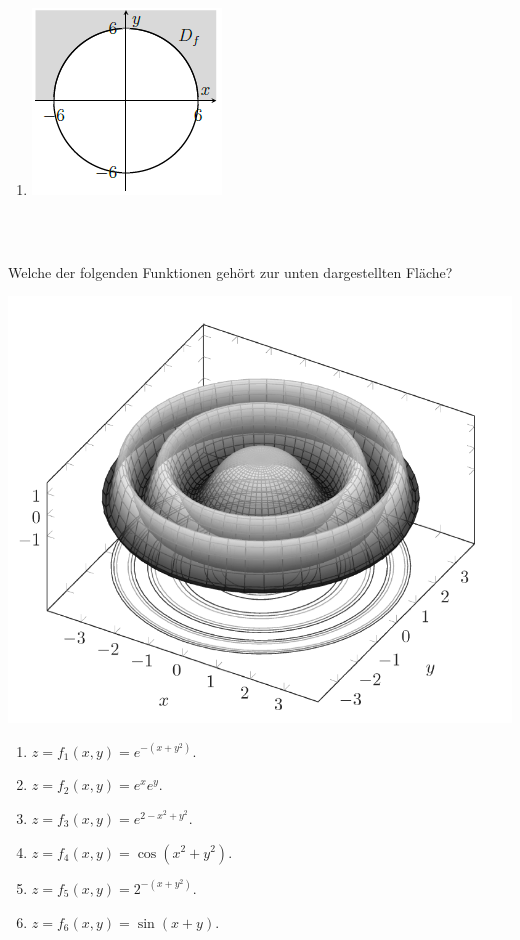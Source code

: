 \begin{enumerate}
\begin{center}
\end{center}
\item
\begin{center}
	\includegraphics[scale=0.6]{pictures/3_4_d}
\end{center}
\end{enumerate}
\ \\
\subsection*{}
Welche der folgenden Funktionen gehört zur unten dargestellten Fläche?\\
\begin{center}
	\includegraphics[scale=0.5]{pictures/3_5}
\end{center}
\renewcommand{\labelenumi}{(\alph{enumi})}
\begin{enumerate}
\item 
$ z = f_1(x,y) = e^{-(x+y^2)} $.
\item
$ z = f_2(x,y) = e^{x} e^y $.
\item
$ z = f_3(x,y) = e^{2 -x^2 +y^2}  $.
\item
$ z = f_4(x,y) = \cos(x^2 +y^2) $.
\item
$ z = f_5(x,y) = 2^{-(x + y^2)} $.
\item
$ z = f_6(x,y) = \sin(x+y) $.
\end{enumerate}
\ \\
